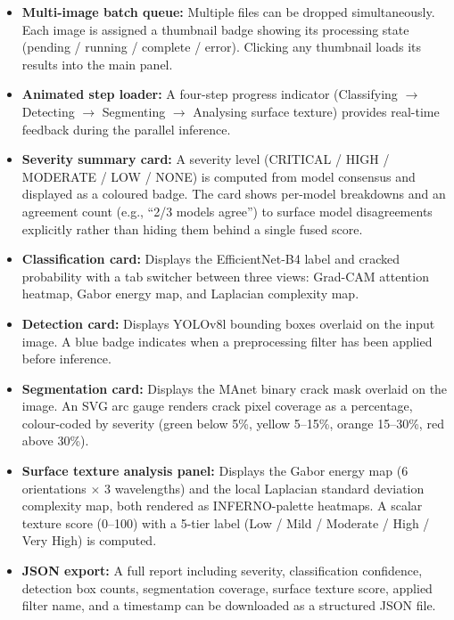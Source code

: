 \documentclass[12pt,a4paper]{article}
\begin{document}
\begin{itemize}[leftmargin=1.5cm]
\item \textbf{Multi-image batch queue:} Multiple files can be dropped simultaneously. Each image is assigned a thumbnail badge showing its processing state (pending / running / complete / error). Clicking any thumbnail loads its results into the main panel.

\item \textbf{Animated step loader:} A four-step progress indicator (Classifying $\to$ Detecting $\to$ Segmenting $\to$ Analysing surface texture) provides real-time feedback during the parallel inference.

\item \textbf{Severity summary card:} A severity level (CRITICAL / HIGH / MODERATE / LOW / NONE) is computed from model consensus and displayed as a coloured badge. The card shows per-model breakdowns and an agreement count (e.g., ``2/3 models agree'') to surface model disagreements explicitly rather than hiding them behind a single fused score.

\item \textbf{Classification card:} Displays the EfficientNet-B4 label and cracked probability with a tab switcher between three views: Grad-CAM attention heatmap, Gabor energy map, and Laplacian complexity map.

\item \textbf{Detection card:} Displays YOLOv8l bounding boxes overlaid on the input image. A blue badge indicates when a preprocessing filter has been applied before inference.

\item \textbf{Segmentation card:} Displays the MAnet binary crack mask overlaid on the image. An SVG arc gauge renders crack pixel coverage as a percentage, colour-coded by severity (green below 5\%, yellow 5--15\%, orange 15--30\%, red above 30\%).

\item \textbf{Surface texture analysis panel:} Displays the Gabor energy map (6 orientations $\times$ 3 wavelengths) and the local Laplacian standard deviation complexity map, both rendered as INFERNO-palette heatmaps. A scalar texture score (0--100) with a 5-tier label (Low / Mild / Moderate / High / Very High) is computed.

\item \textbf{JSON export:} A full report including severity, classification confidence, detection box counts, segmentation coverage, surface texture score, applied filter name, and a timestamp can be downloaded as a structured JSON file.
\end{itemize}
\end{document}
